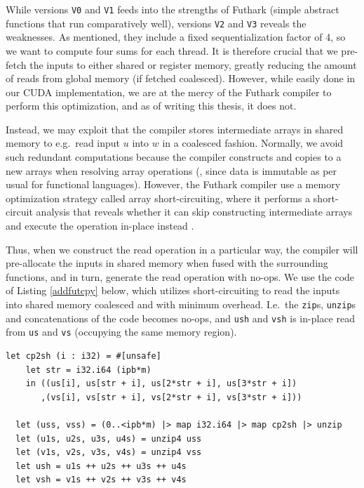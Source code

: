 While versions \texttt{V0} and \texttt{V1} feeds into the strengths of Futhark
(simple abstract functions that run comparatively well), versions \texttt{V2} and
\texttt{V3} reveals the weaknesses. As mentioned, they include a fixed
sequentialization factor of 4, so we want to compute four sums for each
thread. It is therefore crucial that we pre-fetch the inputs to either shared or
register memory, greatly reducing the amount of reads from global memory (if
fetched coalesced). However, while easily done in our CUDA implementation, we
are at the mercy of the Futhark compiler to perform this optimization, and as of
writing this thesis, it does not.

Instead, we may exploit that the compiler stores intermediate arrays in shared
memory to e.g.\ read input $u$ into $w$ in a coalesced fashion. Normally, we
avoid such redundant computations because the compiler constructs and copies to
a new arrays when resolving array operations (, since data is immutable as per
usual for functional languages). However, the Futhark compiler use a memory
optimization strategy called array short-circuiting, where it performs a
short-circuit analysis that reveals whether it can skip constructing
intermediate arrays and execute the operation in-place instead
\cite{futhark/sc22mem}.

Thus, when we construct the read operation in a particular way, the compiler
will pre-allocate the inputs in shared memory when fused with the surrounding
functions, and in turn, generate the read operation with no-ops. We use the code
of Listing \ref{addfutcpy} below, which utilizes short-circuiting to read the
inputs into shared memory coalesced and with minimum overhead. I.e.\ the
\texttt{zip}s, \texttt{unzip}s and concatenations of the code becomes no-ops,
and \texttt{ush} and \texttt{vsh} is in-place read from \texttt{us} and
\texttt{vs} (occupying the same memory region).

\begin{lstlisting}[language=futhark,caption={\footnotesize Futhark code snippet reading
\texttt{us} and \texttt{vs} of size $\mathtt{ipb}\cdot \mathtt{m}$ from global to shared memory coalesced utilizing array short-circuiting (from file \texttt{add.fut} slightly
edited).},label={addfutcpy},gobble=2]
  let cp2sh (i : i32) = #[unsafe]
    let str = i32.i64 (ipb*m)
    in ((us[i], us[str + i], us[2*str + i], us[3*str + i])
       ,(vs[i], vs[str + i], vs[2*str + i], vs[3*str + i]))

  let (uss, vss) = (0..<ipb*m) |> map i32.i64 |> map cp2sh |> unzip
  let (u1s, u2s, u3s, u4s) = unzip4 uss
  let (v1s, v2s, v3s, v4s) = unzip4 vss
  let ush = u1s ++ u2s ++ u3s ++ u4s
  let vsh = v1s ++ v2s ++ v3s ++ v4s
\end{lstlisting}

